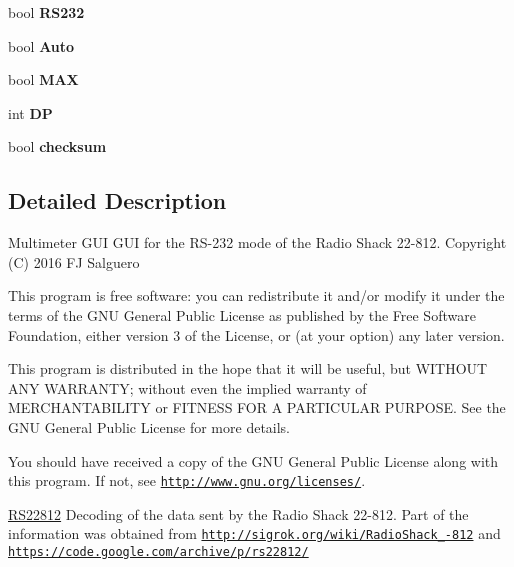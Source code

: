 \begin{DoxyCompactItemize}
\item 
\hypertarget{structFlags_a7ebb04ba14f8d6fa9ad362e2fb5d705b}{bool {\bfseries R\-S232}}\label{structFlags_a7ebb04ba14f8d6fa9ad362e2fb5d705b}

\item 
\hypertarget{structFlags_a66049934037142a256e50de8e0495266}{bool {\bfseries Auto}}\label{structFlags_a66049934037142a256e50de8e0495266}

\item 
\hypertarget{structFlags_a0f4a5f2e9dfa18e691e64ceae6d447a8}{bool {\bfseries M\-A\-X}}\label{structFlags_a0f4a5f2e9dfa18e691e64ceae6d447a8}

\item 
\hypertarget{structFlags_a2180d159d26127a39ff8b3e84969cdc5}{int {\bfseries D\-P}}\label{structFlags_a2180d159d26127a39ff8b3e84969cdc5}

\item 
\hypertarget{structFlags_a08dfc32619ad6bfb8c99c1276e697926}{bool {\bfseries checksum}}\label{structFlags_a08dfc32619ad6bfb8c99c1276e697926}

\end{DoxyCompactItemize}


\subsection{Detailed Description}
Multimeter G\-U\-I G\-U\-I for the R\-S-\/232 mode of the Radio Shack 22-\/812. Copyright (C) 2016 F\-J Salguero

This program is free software\-: you can redistribute it and/or modify it under the terms of the G\-N\-U General Public License as published by the Free Software Foundation, either version 3 of the License, or (at your option) any later version.

This program is distributed in the hope that it will be useful, but W\-I\-T\-H\-O\-U\-T A\-N\-Y W\-A\-R\-R\-A\-N\-T\-Y; without even the implied warranty of M\-E\-R\-C\-H\-A\-N\-T\-A\-B\-I\-L\-I\-T\-Y or F\-I\-T\-N\-E\-S\-S F\-O\-R A P\-A\-R\-T\-I\-C\-U\-L\-A\-R P\-U\-R\-P\-O\-S\-E. See the G\-N\-U General Public License for more details.

You should have received a copy of the G\-N\-U General Public License along with this program. If not, see \href{http://www.gnu.org/licenses/}{\tt http\-://www.\-gnu.\-org/licenses/}.

\hyperlink{classRS22812}{R\-S22812} Decoding of the data sent by the Radio Shack 22-\/812. Part of the information was obtained from \href{http://sigrok.org/wiki/RadioShack_22-812}{\tt http\-://sigrok.\-org/wiki/\-Radio\-Shack\-\_-\/812} and \href{https://code.google.com/archive/p/rs22812/}{\tt https\-://code.\-google.\-com/archive/p/rs22812/}

